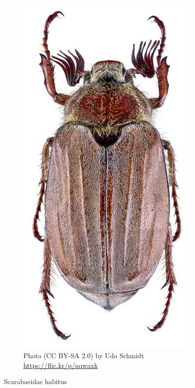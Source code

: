 \documentclass[letterpaper, 11pt]{article}
\begin{document}
\begin{figure}[ht!]
\begin{subfigure}[ht!]{0.23\textwidth}
    \includegraphics[width=\textwidth]{ScarabHabitus4}
  \caption{Photo (CC BY-SA 2.0) by Udo Schmidt \url{https://flic.kr/p/nqwaxk}}
  \label{fig:scarabaeid3}
\end{subfigure}
    \caption{Scarabaeidae habitus}\label{fig:scarabaeids}
\end{figure}
\end{document}
